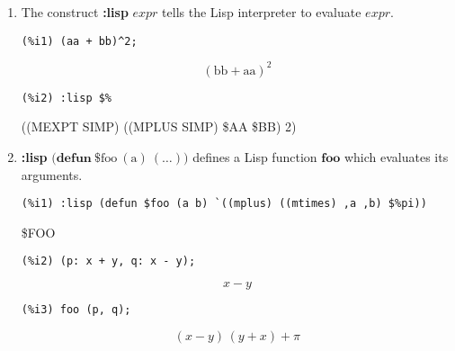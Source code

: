 \documentclass[12pt,leqno]{article}
\begin{document}
\begin{enumerate}

\item The construct {\bf :lisp} $\mathit{expr}$ tells the Lisp interpreter
to evaluate $\mathit{expr}$.
\begin{verbatim}
(%i1) (aa + bb)^2;
\end{verbatim}
\begin{equation}
\left(\mathrm{bb}+\mathrm{aa}\right)^2\tag{\%o1}
\label{eq:doc-group1-code36-1-1}
\end{equation}
\begin{verbatim}
(%i2) :lisp $%
\end{verbatim}
((MEXPT SIMP) ((MPLUS SIMP) \$AA \$BB) 2)


\item {\bf :lisp} $\mathrm{(}\mathbf{defun\ } \mathrm{\$foo\ (a)\ (\ldots))}$
defines a Lisp function $\mathbf{foo}$ which evaluates its arguments.
\begin{verbatim}
(%i1) :lisp (defun $foo (a b) `((mplus) ((mtimes) ,a ,b) $%pi))
\end{verbatim}
\$FOO
\begin{verbatim}
(%i2) (p: x + y, q: x - y);
\end{verbatim}
\begin{equation}
x-y\tag{\%o2}
\label{eq:doc-group1-code37-2-1}
\end{equation}
\begin{verbatim}
(%i3) foo (p, q);
\end{verbatim}
\begin{equation}
\left(x-y\right)\,\left(y+x\right)+\pi\tag{\%o3}
\label{eq:doc-group1-code37-3-1}
\end{equation}



\end{enumerate}
\end{document}

